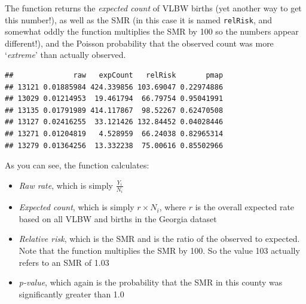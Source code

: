 \documentclass[
]{book}
\newenvironment{Shaded}{\begin{snugshade}}{\end{snugshade}}
\newcommand{\AttributeTok}[1]{\textcolor[rgb]{0.77,0.63,0.00}{#1}}
\newcommand{\CommentTok}[1]{\textcolor[rgb]{0.56,0.35,0.01}{\textit{#1}}}
\newcommand{\FunctionTok}[1]{\textcolor[rgb]{0.00,0.00,0.00}{#1}}
\newcommand{\NormalTok}[1]{#1}
\newcommand{\OtherTok}[1]{\textcolor[rgb]{0.56,0.35,0.01}{#1}}
\newcommand{\SpecialCharTok}[1]{\textcolor[rgb]{0.00,0.00,0.00}{#1}}
\newcommand{\StringTok}[1]{\textcolor[rgb]{0.31,0.60,0.02}{#1}}
\providecommand{\tightlist}{%
  \setlength{\itemsep}{0pt}\setlength{\parskip}{0pt}}
\begin{document}
The function returns the \emph{expected count} of VLBW births (yet another way to get this number!), as well as the SMR (in this case it is named \texttt{relRisk}, and somewhat oddly the function multiplies the SMR by 100 so the numbers appear different!), and the Poisson probability that the observed count was more `\emph{extreme}' than actually observed.

\begin{Shaded}
\end{Shaded}

\begin{verbatim}
##              raw   expCount   relRisk       pmap
## 13121 0.01885984 424.339856 103.69047 0.22974886
## 13029 0.01214953  19.461794  66.79754 0.95041991
## 13135 0.01791989 414.117867  98.52267 0.62470508
## 13127 0.02416255  33.121426 132.84452 0.04028446
## 13271 0.01204819   4.528959  66.24038 0.82965314
## 13279 0.01364256  13.332238  75.00616 0.85502966
\end{verbatim}

As you can see, the function calculates:

\begin{itemize}
\tightlist
\item
  \emph{Raw rate}, which is simply \(\frac{Y_i}{N_i}\)
\item
  \emph{Expected count}, which is simply \(r\times N_i\), where \(r\) is the overall expected rate based on all VLBW and births in the Georgia dataset
\item
  \emph{Relative risk}, which is the SMR and is the ratio of the observed to expected. Note that the function multiplies the SMR by 100. So the value 103 actually refers to an SMR of 1.03
\item
  \emph{p-value}, which again is the probability that the SMR in this county was significantly greater than 1.0
\end{itemize}
\end{document}
